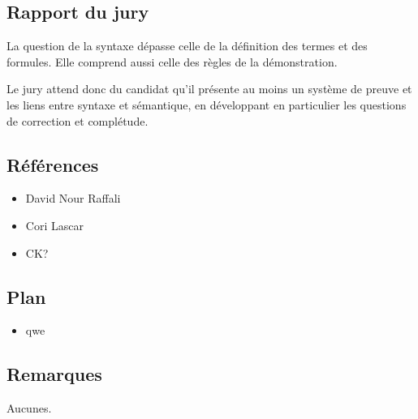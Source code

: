 \documentclass[../../agregation.tex]{subfiles}
\begin{document}

\subsection{Rapport du jury}

\begin{aquote}{}
La question de la syntaxe dépasse celle de la définition des termes et des formules. Elle comprend aussi celle des règles de la démonstration.

Le jury attend donc du candidat qu'il présente au moins un système de preuve et les liens entre syntaxe et sémantique, en développant en particulier les questions de correction et complétude.
\end{aquote}

\dvts

\subsection{Références}

\begin{itemize}
	\item David Nour Raffali
	\item Cori Lascar
	\item CK?
\end{itemize}

\subsection{Plan}

\begin{itemize}
	\item qwe
\end{itemize}

\subsection{Remarques}

Aucunes.
\end{document}
